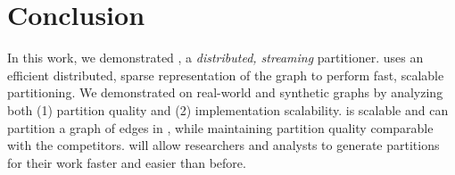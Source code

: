 \section{Conclusion} \label{sec:conc}
In this work, we demonstrated \ourmethod, a \emph{distributed, streaming} partitioner.
\ourmethod uses an efficient distributed, sparse representation of the graph to perform fast, scalable partitioning.
We demonstrated \ourmethod on real-world and synthetic graphs by analyzing both (1) partition quality and (2) implementation scalability.
\ourmethod is scalable and can partition a graph of \largestgraphedges edges in \largestgraphtime, while maintaining partition quality comparable with the competitors.
\ourmethod will allow researchers and analysts to generate partitions for their work faster and easier than before.


